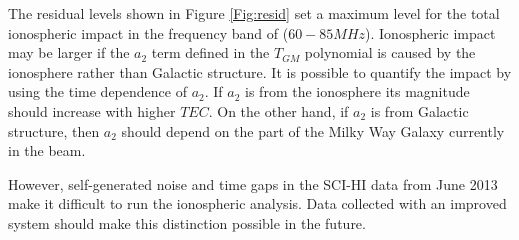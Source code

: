 The residual levels shown in Figure \ref{Fig:resid} set a maximum level for the total ionospheric impact in the frequency band of ($60-85 MHz$).  Ionospheric impact may be larger if the $a_2$ term defined in the $T_{GM}$ polynomial is caused by the ionosphere rather than Galactic structure. It is possible to quantify the impact by using the time dependence of $a_2$. If $a_2$ is from the ionosphere its magnitude should increase with higher $TEC$. On the other hand, if $a_2$ is from Galactic structure, then $a_2$ should depend on the part of the Milky Way Galaxy currently in the beam. 

However, self-generated noise and time gaps in the SCI-HI data from June 2013 make it difficult to run the ionospheric analysis. Data collected with an improved system should make this distinction possible in the future. 
